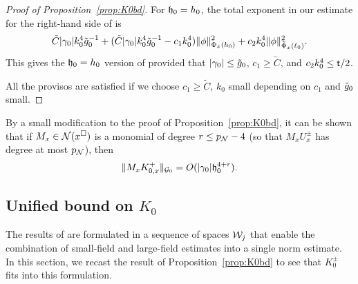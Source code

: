 \begin{proof}[Proof of Proposition~\ref{prop:K0bd}]
For $\mathfrak{h}_0=h_0$, the total exponent in our estimate for the right-hand side of 
is
\begin{equation}
    \tilde C |\gamma_0| k_0^4 \tilde{g}_0^{-1}
        + (\tilde C |\gamma_0| k_0^4 \tilde{g}_0^{-1} - c_1 k_0^4) \|\phi\|^2_{\Phi_x(h_0)}
        + c_2 k_0^4 \|\phi\|^2_{\tilde\Phi_x(\ell_0)}.
\end{equation}
This gives the $\mathfrak{h}_0=h_0$ version of  provided that
$|\gamma_0| \le \tilde{g}_0$, $c_1\ge \tilde C$, and $c_2 k_0^4 \le {\sf t}/2$.

All the provisos are satisfied
if we choose
$c_1 \ge \tilde C$,
$k_0$ small depending on $c_1$
and $\tilde{g}_0$ small.
\end{proof}


\begin{rk}
By a small modification to the proof of Proposition~\ref{prop:K0bd},
it can be shown that if $M_x \in \mathcal{N}(x^\square)$ is a monomial of
degree $r \le p_{\mathcal{N}} -4$ (so that $M_xU_x^\pm$ has degree at most $p_{\mathcal{N}}$), then
\begin{equation}
\label{e:K0bd-gen}
\|M_x K^+_{0,x}\|_{\mathcal{G}_0} = O(|\gamma_0| \mathfrak{h}_0^{4+r}).
\end{equation}
\end{rk}


\subsection{Unified bound on \texorpdfstring{$K_0$}{K0}}
\label{sec:KWcal}

The results of \cite{BS-rg-step,BBS-rg-flow} are formulated in a sequence of spaces $\mathcal{W}_j$ that
enable the combination of small-field and large-field estimates into a single norm estimate.
In this section, we recast the result of Proposition~\ref{prop:K0bd} to see that $K_0^\pm$
fits into this formulation.

